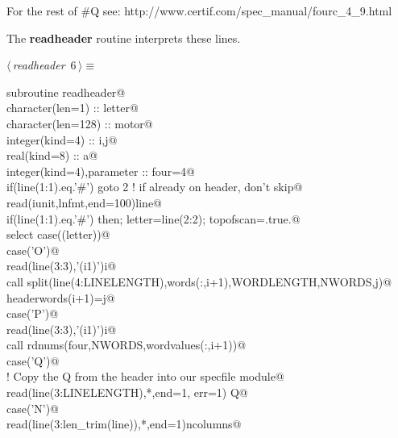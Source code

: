 \documentclass[10pt,a4paper,notitlepage]{article}
\newcommand{\code}[1]{\textbf{\textsf{#1}}} %
\begin{document}
For the rest of \#Q see: http://www.certif.com/spec\_manual/fourc\_4\_9.html

The \code{readheader} routine interprets these lines. 

\begin{flushleft} \small
\begin{minipage}{\linewidth}\label{scrap4}\raggedright\small
{} $\langle\,${\it readheader}\nobreak\ {\footnotesize {6}}$\,\rangle\equiv$
\vspace{-1ex}
\begin{list}{}{} \item
\mbox{}\verb@      subroutine readheader@\\
\mbox{}\verb@      character(len=1) :: letter@\\
\mbox{}\verb@      character(len=128) :: motor@\\
\mbox{}\verb@      integer(kind=4) :: i,j@\\
\mbox{}\verb@      real(kind=8) :: a@\\
\mbox{}\verb@      integer(kind=4),parameter :: four=4@\\
\mbox{}\verb@      if(line(1:1).eq.'#') goto 2 ! if already on header, don't skip@\\
\mbox{}     read(iunit,lnfmt,end=100)line@\\
\mbox{}     if(line(1:1).eq.'#') then; letter=line(2:2); topofscan=.true.@\\
\mbox{}\verb@       select case((letter))@\\
\mbox{}\verb@        case('O')@\\
\mbox{}\verb@         read(line(3:3),'(i1)')i@\\
\mbox{}\verb@         call split(line(4:LINELENGTH),words(:,i+1),WORDLENGTH,NWORDS,j)@\\
\mbox{}\verb@         headerwords(i+1)=j@\\
\mbox{}\verb@        case('P')@\\
\mbox{}\verb@         read(line(3:3),'(i1)')i@\\
\mbox{}\verb@         call rdnums(four,NWORDS,wordvalues(:,i+1))@\\
\mbox{}\verb@        case('Q')@\\
\mbox{}\verb@! Copy the Q from the header into our specfile module@\\
\mbox{}\verb@         read(line(3:LINELENGTH),*,end=1, err=1) Q@\\
\mbox{}\verb@        case('N')@\\
\mbox{}\verb@         read(line(3:len_trim(line)),*,end=1)ncolumns@\\

\end{list}
\end{minipage}
\end{flushleft}
\end{document}
